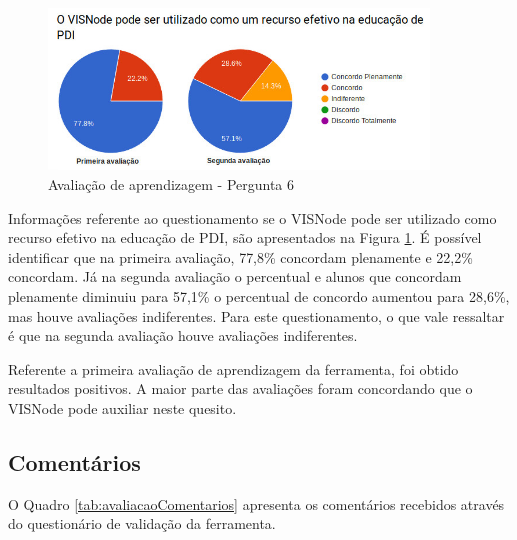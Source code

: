 \documentclass[
	12pt,				%
	oneside,			%
	a4paper,			%
	english,			%
	french,				%
	spanish,			%
	brazil,				%
	]{abntex2}
\begin{document}
\begin{figure}[H]
\centering
\caption{Avaliação de aprendizagem - Pergunta 6}\label{fig:avaliacaoAprendizagem6}
\includegraphics[width=0.9\textwidth]{imagens/avaliacoes/aprendizagem_6.jpg}
\sourceAuthor
\end{figure}

Informações referente ao questionamento se o VISNode pode ser utilizado como recurso efetivo na educação de PDI, são apresentados na Figura \ref{fig:avaliacaoAprendizagem6}. É possível identificar que na primeira avaliação, 77,8\% concordam plenamente e 22,2\% concordam. Já na segunda avaliação o percentual e alunos que concordam plenamente diminuiu para 57,1\% o percentual de concordo aumentou para 28,6\%, mas houve avaliações indiferentes. Para este questionamento, o que vale ressaltar é que na segunda avaliação houve avaliações indiferentes.

Referente a primeira avaliação de aprendizagem da ferramenta, foi obtido resultados positivos. A maior parte das avaliações foram concordando que o VISNode pode auxiliar neste quesito.

\subsection{Comentários}

O Quadro \ref{tab:avaliacaoComentarios} apresenta os comentários recebidos através do questionário de validação da ferramenta.
\end{document}
